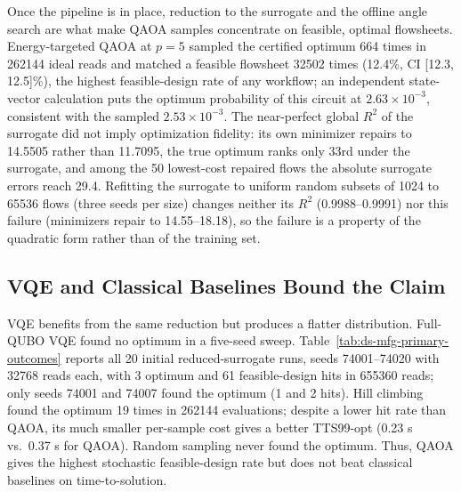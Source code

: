 \documentclass[10pt,letterpaper]{article}
\begin{document}
Once the pipeline is in place, reduction to the surrogate and the offline angle search are what make QAOA samples concentrate on feasible, optimal flowsheets.
Energy-targeted QAOA at $p=5$ sampled the certified optimum 664 times in 262144 ideal reads and matched a feasible flowsheet 32502 times (12.4\%, CI [12.3, 12.5]\%), the highest feasible-design rate of any workflow; an independent state-vector calculation puts the optimum probability of this circuit at $2.63\times 10^{-3}$, consistent with the sampled $2.53\times 10^{-3}$.
The near-perfect global $R^2$ of the surrogate did not imply optimization fidelity: its own minimizer repairs to 14.5505 rather than 11.7095, the true optimum ranks only 33rd under the surrogate, and among the 50 lowest-cost repaired flows the absolute surrogate errors reach 29.4.
Refitting the surrogate to uniform random subsets of 1024 to 65536 flows (three seeds per size) changes neither its $R^2$ (0.9988--0.9991) nor this failure (minimizers repair to 14.55--18.18), so the failure is a property of the quadratic form rather than of the training set.

\subsection{VQE and Classical Baselines Bound the Claim}
\label{subsec:ds-mfg-vqe-classical-main}

VQE benefits from the same reduction but produces a flatter distribution.
Full-QUBO VQE found no optimum in a five-seed sweep.
Table~\ref{tab:ds-mfg-primary-outcomes} reports all 20 initial reduced-surrogate runs, seeds 74001--74020 with 32768 reads each, with 3 optimum and 61 feasible-design hits in 655360 reads; only seeds 74001 and 74007 found the optimum (1 and 2 hits).
Hill climbing found the optimum 19 times in 262144 evaluations; despite a lower hit rate than QAOA, its much smaller per-sample cost gives a better TTS99-opt (0.23 s vs.\ 0.37 s for QAOA).
Random sampling never found the optimum.
Thus, QAOA gives the highest stochastic feasible-design rate but does not beat classical baselines on time-to-solution.
\end{document}
